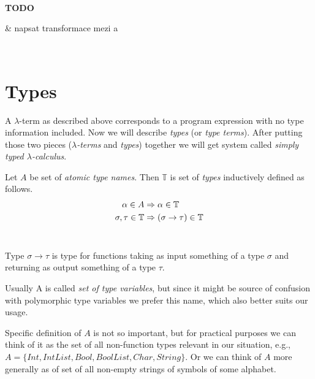 \documentclass[12pt,a4paper]{report}
\newcommand{\lterm}{$\lambda$-term\xspace}
\newcommand{\lterms}{$\lambda$-terms\xspace}
\newenvironment{todo}
{ ~\\[0.5em]
  {\color{red}\textbf{TODO}}
  \begin{easylist}[itemize]}
{ \end{easylist}
  ~}
\begin{document}
\begin{todo}
 & napsat transformace mezi \atTree a \sexprTree
\end{todo}

\newpage
\section{Types}
\label{deftype}

\newcommand{\ar}{\rightarrow\xspace}
\newcommand{\T}{\mathbb{T}\xspace}

A \lterm as described above
corresponds to a program expression with no type information
included. Now we will describe \textit{types} (or \textit{type terms}).
After putting those two pieces 
(\textit{\lterms} and \textit{types}) together 
we will get system called \textit{simply typed $\lambda$-calculus}.


\begin{definition}
Let $A$ be set of {\it atomic type names}. 
Then $\mathbb{T}$ is set of {\it types} inductively defined as follows.
\begin{align*}
\alpha      \in A  &\then   \alpha \in \T \\
\sigma,\tau \in \T &\then ( \sigma \ar  \tau ) \in \T 
\end{align*}~

\end{definition}

Type $\sigma \ar \tau$ is type for functions taking as input
something of a type $\sigma$ and returning 
as output something of a type $\tau$. 

Usually A is called \textit{set of type variables}, 
but since it might be source of confusion with polymorphic type variables
we prefer this name, which also better suits our usage. 

Specific definition of $A$ is not so important, but for practical purposes 
we can think of it as the set of all non-function types relevant in our
situation, e.g., $A = \{ Int , IntList , Bool, BoolList , Char, String \}$.
Or we can think of $A$ more generally as of set of all non-empty strings
of symbols of some alphabet. \\
\end{document}
